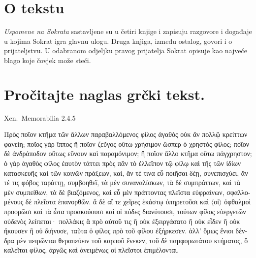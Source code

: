 

\section*{O tekstu}

\textit{Uspomene na Sokrata} sastavljene su u četiri knjige i zapisuju razgovore i događaje u kojima Sokrat igra glavnu ulogu. Druga knjiga, između ostalog, govori i o prijateljstvu. U odabranom odjeljku pravog prijatelja Sokrat opisuje kao najveće blago koje čovjek može steći.


\section*{Pročitajte naglas grčki tekst.}

Xen.\ Memorabilia 2.4.5


\medskip

\begin{greek}
{\large
{ \noindent Πρὸς ποῖον κτῆμα τῶν ἄλλων παραβαλλόμενος φίλος ἀγαθὸς οὐκ ἂν πολλῷ κρείττων φανείη; ποῖος γὰρ ἵππος ἢ ποῖον ζεῦγος οὕτω χρήσιμον ὥσπερ ὁ χρηστὸς φίλος; ποῖον δὲ ἀνδράποδον οὕτως εὔνουν καὶ παραμόνιμον; ἢ ποῖον ἄλλο κτῆμα οὕτω πάγχρηστον; ὁ γὰρ ἀγαθὸς φίλος ἑαυτὸν τάττει πρὸς πᾶν τὸ ἐλλεῖπον τῷ φίλῳ καὶ τῆς τῶν ἰδίων κατασκευῆς καὶ τῶν κοινῶν πράξεων, καί, ἄν τέ τινα εὖ ποιῆσαι δέῃ, συνεπισχύει, ἄν τέ τις φόβος ταράττῃ, συμβοηθεῖ, τὰ μὲν συναναλίσκων, τὰ δὲ συμπράττων, καὶ τὰ μὲν συμπείθων, τὰ δὲ βιαζόμενος, καὶ εὖ μὲν πράττοντας πλεῖστα εὐφραίνων, σφαλλομένους δὲ πλεῖστα ἐπανορθῶν. ἃ δὲ αἵ τε χεῖρες ἑκάστῳ ὑπηρετοῦσι καὶ $\langle$οἱ$\rangle$ ὀφθαλμοὶ προορῶσι καὶ τὰ ὦτα προακούουσι καὶ οἱ πόδες διανύτουσι, τούτων φίλος εὐεργετῶν οὐδενὸς λείπεται· πολλάκις ἃ πρὸ αὑτοῦ τις ἢ οὐκ ἐξειργάσατο ἢ οὐκ εἶδεν ἢ οὐκ ἤκουσεν ἢ οὐ διήνυσε, ταῦτα ὁ φίλος πρὸ τοῦ φίλου ἐξήρκεσεν. ἀλλ' ὅμως ἔνιοι δένδρα μὲν πειρῶνται θεραπεύειν τοῦ καρποῦ ἕνεκεν, τοῦ δὲ παμφορωτάτου κτήματος, ὃ καλεῖται φίλος, ἀργῶς καὶ ἀνειμένως οἱ πλεῖστοι ἐπιμέλονται.

}
}
\end{greek}

